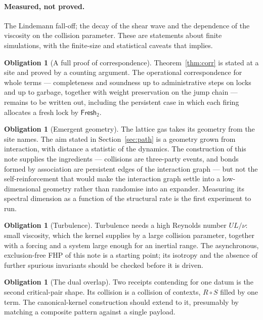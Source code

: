 \documentclass[11pt,a4paper]{article}
\theoremstyle{plain}
\theoremstyle{definition}
\newtheorem{obligation}[theorem]{Obligation}
\theoremstyle{remark}
\newcommand{\coll}{\circ}
\newcommand{\Frsh}{\mathsf{Fresh}_2}
\begin{document}
\paragraph{Measured, not proved.} The Lindemann fall-off; the decay of the
shear wave and the dependence of the viscosity on the collision parameter.
These are statements about finite simulations, with the finite-size and
statistical caveats that implies.

\begin{obligation}[A full proof of correspondence]\label{ob:corr}
Theorem~\ref{thm:corr} is stated at a site and proved by a counting argument.
The operational correspondence for whole terms --- completeness and soundness up
to administrative steps on locks and up to garbage, together with weight
preservation on the jump chain --- remains to be written out, including the
persistent case in which each firing allocates a fresh lock by $\Frsh$.
\end{obligation}

\begin{obligation}[Emergent geometry]\label{ob:geometry}
The lattice gas takes its geometry from the site names. The aim stated in
Section~\ref{sec:path} is a geometry grown from interaction, with distance a
statistic of the dynamics. The construction of this note supplies the
ingredients --- collisions are three-party events, and bonds formed by
association are persistent edges of the interaction graph --- but not the
self-reinforcement that would make the interaction graph settle into a
low-dimensional geometry rather than randomise into an expander. Measuring its
spectral dimension as a function of the structural rate is the first
experiment to run.
\end{obligation}

\begin{obligation}[Turbulence]\label{ob:turbulence}
Turbulence needs a high Reynolds number $UL/\nu$: small viscosity, which the
kernel supplies by a large collision parameter, together with a forcing and a
system large enough for an inertial range. The asynchronous, exclusion-free
FHP of this note is a starting point; its isotropy and the absence of further
spurious invariants should be checked before it is driven.
\end{obligation}

\begin{obligation}[The dual overlap]\label{ob:dual}
Two receipts contending for one datum is the second critical-pair shape. Its
collision is a collision of contexts, $R\coll S$ filled by one term. The
canonical-kernel construction should extend to it, presumably by matching a
composite pattern against a single payload.
\end{obligation}
\end{document}
